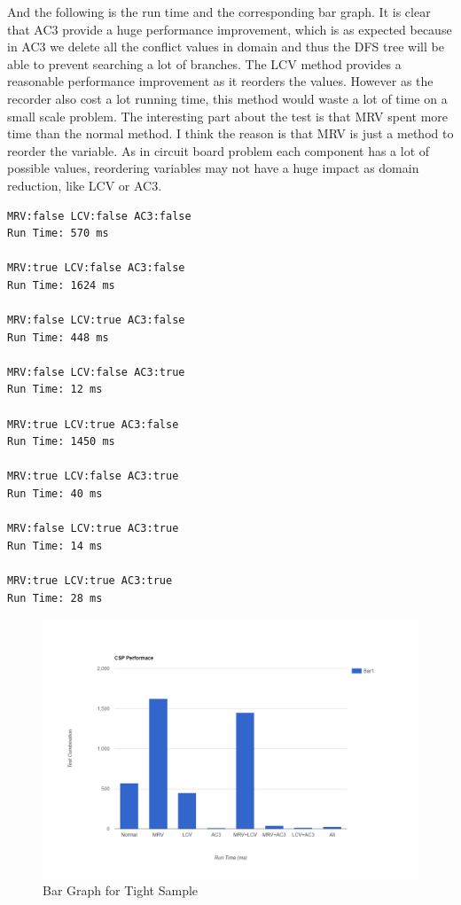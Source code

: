\documentclass{article}
\begin{document}
And the following is the run time and the corresponding bar graph. It is clear that AC3 provide a huge performance improvement, which is as expected because in AC3 we delete all the conflict values in domain and thus the DFS tree will be able to prevent searching a lot of branches. The LCV method provides a reasonable performance improvement as it reorders the values. However as the recorder also cost a lot running time, this method would waste a lot of time on a small scale problem. The interesting part about the test is that MRV spent more time than the normal method. I think the reason is that MRV is just a method to reorder the variable. As in circuit board problem each component has a lot of possible values, reordering variables may not have a huge impact as domain reduction, like LCV or AC3.
\begin{lstlisting}
MRV:false LCV:false AC3:false
Run Time: 570 ms

MRV:true LCV:false AC3:false
Run Time: 1624 ms

MRV:false LCV:true AC3:false
Run Time: 448 ms

MRV:false LCV:false AC3:true
Run Time: 12 ms

MRV:true LCV:true AC3:false
Run Time: 1450 ms

MRV:true LCV:false AC3:true
Run Time: 40 ms

MRV:false LCV:true AC3:true
Run Time: 14 ms

MRV:true LCV:true AC3:true
Run Time: 28 ms
\end{lstlisting}
\begin{figure}[H]
\centering
\includegraphics[width=\linewidth]{TightBarGraph}
\caption{Bar Graph for Tight Sample}
\end{figure}
\end{document}
